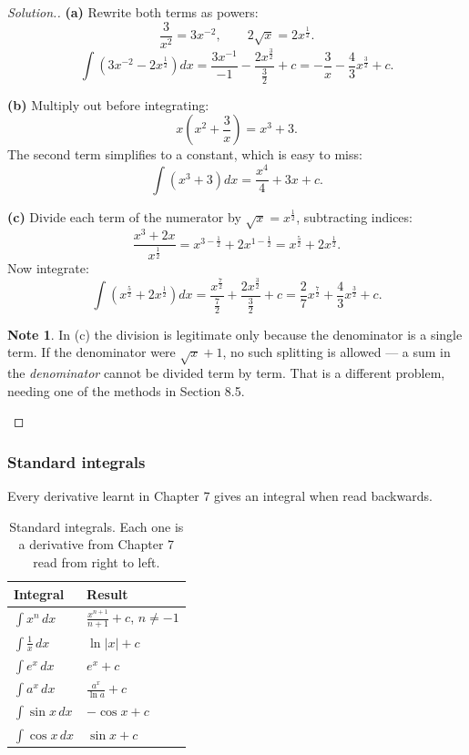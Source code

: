 \documentclass[11pt,a4paper]{article}
\theoremstyle{definition}
\newtheorem{note}[thm]{Note}
\newenvironment{solution}
  {\renewcommand{\qedsymbol}{}\begin{proof}[\textit{Solution}.]}
  {\end{proof}}
\begin{document}
\begin{solution}
\textbf{(a)} Rewrite both terms as powers:
$$\frac{3}{x^2}=3x^{-2},\qquad 2\sqrt{x}=2x^{\frac{1}{2}}.$$
$$\int\left(3x^{-2}-2x^{\frac{1}{2}}\right)dx
=\frac{3x^{-1}}{-1}-\frac{2x^{\frac{3}{2}}}{\frac{3}{2}}+c
=-\frac{3}{x}-\frac{4}{3}x^{\frac{3}{2}}+c.$$

\textbf{(b)} Multiply out before integrating:
$$x\left(x^2+\frac{3}{x}\right)=x^3+3.$$
The second term simplifies to a constant, which is easy to miss:
$$\int\left(x^3+3\right)dx=\frac{x^4}{4}+3x+c.$$

\textbf{(c)} Divide each term of the numerator by $\sqrt{x}=x^{\frac{1}{2}}$, subtracting
indices:
$$\frac{x^3+2x}{x^{\frac{1}{2}}}=x^{3-\frac{1}{2}}+2x^{1-\frac{1}{2}}
=x^{\frac{5}{2}}+2x^{\frac{1}{2}}.$$
Now integrate:
$$\int\left(x^{\frac{5}{2}}+2x^{\frac{1}{2}}\right)dx
=\frac{x^{\frac{7}{2}}}{\frac{7}{2}}+\frac{2x^{\frac{3}{2}}}{\frac{3}{2}}+c
=\frac{2}{7}x^{\frac{7}{2}}+\frac{4}{3}x^{\frac{3}{2}}+c.$$

\begin{note}
In (c) the division is legitimate only because the denominator is a single term. If the
denominator were $\sqrt{x}+1$, no such splitting is allowed --- a sum in the
\emph{denominator} cannot be divided term by term. That is a different problem, needing
one of the methods in Section 8.5.
\end{note}
\end{solution}

\subsubsection{Standard integrals}

Every derivative learnt in Chapter 7 gives an integral when read backwards.

\begin{table}[H]
\centering
\begin{tabular}{|l|l|}
\hline
Integral & Result\\
\hline
$\int x^n\,dx$ & $\frac{x^{n+1}}{n+1}+c$, \quad $n\neq-1$\\[3pt]
$\int \frac{1}{x}\,dx$ & $\ln|x|+c$\\[3pt]
$\int e^x\,dx$ & $e^x+c$\\[3pt]
$\int a^x\,dx$ & $\frac{a^x}{\ln a}+c$\\[3pt]
$\int \sin x\,dx$ & $-\cos x+c$\\[3pt]
$\int \cos x\,dx$ & $\sin x+c$\\
\hline
\end{tabular}
\caption{Standard integrals. Each one is a derivative from Chapter 7 read from right to left.}
\end{table}
\end{document}
